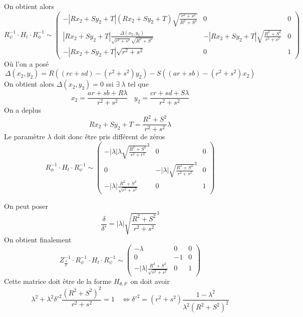  On obtient alors 
\begin{equation*}
R_{\psi}^{-1} \cdot H_t \cdot R_{\phi}^{-1} \sim 
 \begin{pmatrix}
 -|R x_2 +S y_2 +T|(R x_2 +S y_2 +T)\sqrt{\frac{r^2 + s^2}{R^2 + S^2}}&0&0\\
 |R x_2 +S y_2 +T|\frac{\Delta(x_2 , y_2)}{\sqrt{r^2 + s^2}\sqrt{R^2 + S^2}}&-|R x_2 +S y_2 +T|\sqrt{\frac{R^2 + S^2}{r^2 + s^2}}&0\\
 -|R x_2 +S y_2 +T|\sqrt{r^2 + s^2}&0&1
 \end{pmatrix}
\end{equation*}
Où l'on a posé 
\begin{equation*}
\Delta(x_2 , y_2 ) =R ((rc+sd)-(r^2 + s^2)y_2) - S ((ar+sb)-(r^2 + s^2 )x_2)
\end{equation*}
On obtient alors $\Delta(x_2 , y_2 )=0$ ssi $\exists ~\lambda$ tel que 
\begin{equation*}
x_2=\frac{ar+sb+R \lambda}{r^2 +s^2}~~~~y_2=\frac{cr+sd+S \lambda}{r^2 +s^2}
\end{equation*}
On a deplus 
\begin{equation*}
R x_2 +S y_2 +T = \frac{R^2 +S^2}{r^2 + s^2} \lambda
\end{equation*}
Le paramètre $\lambda$ doit donc être pris différent de zéros 
\begin{equation*}
R_{\phi}^{-1} \cdot H_t \cdot R_{\psi}^{-1} \sim 
 \begin{pmatrix}
 -| \lambda | \lambda \sqrt{\frac{R^2 + S^2}{s^2 + r^2}}^{3}&0&0\\
0&-| \lambda | \sqrt{\frac{R^2 + S^2}{r^2 + s^2}}^{3}&0\\
 -|\lambda|\frac{R^2 + S^2}{\sqrt{r^2 + s^2}}&0&1
 \end{pmatrix}
\end{equation*}
 
 
 On peut poser 
 \begin{equation*}
 \frac{\delta}{\delta'}=|\lambda|\sqrt{\frac{R^2 + S^2}{r^2 + s^2}}^{3}
 \end{equation*}
On obtient finalement
\begin{equation*}
Z_{\frac{\delta}{\delta'}}^{-1} \cdot R_{\phi}^{-1} \cdot H_t \cdot R_{\psi}^{-1} \sim 
 \begin{pmatrix}
 -\lambda&0&0\\
0&-1&0\\
 -|\lambda|\frac{R^2 + S^2}{\sqrt{r^2 + s^2}}&0&1
 \end{pmatrix}
 \end{equation*}
 Cette matrice doit être de la forme $H_{\theta,\delta'}$ on doit avoir 
 \begin{equation*}
 \lambda^2 + \lambda^2 \delta'^2 \frac{(R^2 + S^2)^2}{r^2 + s^2}=1 ~~~~\iff \delta'^2 = (r^2 + s^2) \frac{1-\lambda^2}{\lambda^2 (R^2+S^2)^2}
 \end{equation*}
 
